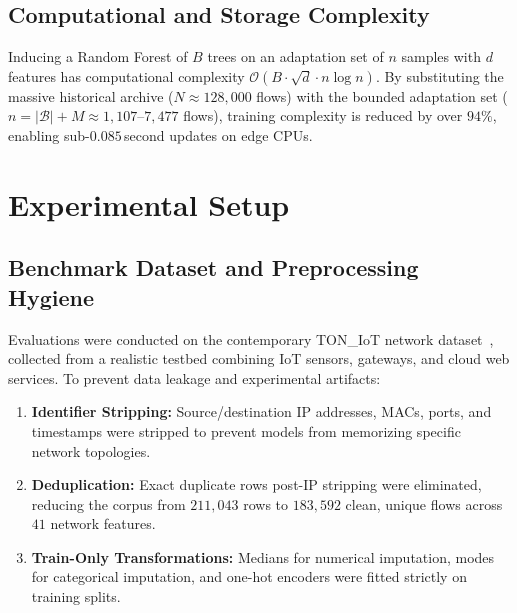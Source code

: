 \documentclass[conference]{IEEEtran}
\begin{document}
\subsection{Computational and Storage Complexity}
Inducing a Random Forest of $B$ trees on an adaptation set of $n$ samples with $d$ features has computational complexity $\mathcal{O}(B \cdot \sqrt{d} \cdot n \log n)$. By substituting the massive historical archive ($N \approx 128{,}000$ flows) with the bounded adaptation set ($n = |\mathcal{B}| + M \approx 1{,}107\text{--}7{,}477$ flows), training complexity is reduced by over $94\%$, enabling sub-$0.085$\,second updates on edge CPUs.

\section{Experimental Setup}
\label{sec:experimental_setup}

\subsection{Benchmark Dataset and Preprocessing Hygiene}
Evaluations were conducted on the contemporary TON\_IoT network dataset~\cite{alshammari2020toniot}, collected from a realistic testbed combining IoT sensors, gateways, and cloud web services. To prevent data leakage and experimental artifacts:
\begin{enumerate}
    \item \textbf{Identifier Stripping:} Source/destination IP addresses, MACs, ports, and timestamps were stripped to prevent models from memorizing specific network topologies.
    \item \textbf{Deduplication:} Exact duplicate rows post-IP stripping were eliminated, reducing the corpus from $211{,}043$ rows to $183{,}592$ clean, unique flows across $41$ network features.
    \item \textbf{Train-Only Transformations:} Medians for numerical imputation, modes for categorical imputation, and one-hot encoders were fitted strictly on training splits.
\end{enumerate}
\end{document}
